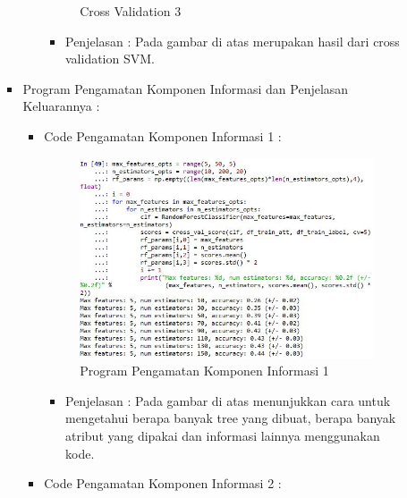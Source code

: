 \begin{enumerate}
\begin{itemize}
\begin{itemize}
\begin{itemize}
\begin{figure}[ht]
\caption{Cross Validation 3}
\label{contoh}
\end{figure}
\par
\begin{itemize}
\item Penjelasan : Pada gambar di atas merupakan hasil dari cross validation SVM.
\par
\par
\end{itemize}
\end{itemize}

\par
\par
\item Program Pengamatan Komponen Informasi dan Penjelasan Keluarannya :
\begin{itemize}
\item Code Pengamatan Komponen Informasi 1 :
\par
\begin{figure}[ht]
\centering
\includegraphics[scale=0.7]{figures/hmm/cod29.jpg}
\caption{Program Pengamatan Komponen Informasi 1}
\label{contoh}
\end{figure}
\par
\begin{itemize}
\item Penjelasan : Pada gambar di atas menunjukkan cara untuk mengetahui berapa banyak tree yang dibuat, berapa banyak atribut yang dipakai dan informasi lainnya menggunakan kode.
\par 
\par
\end{itemize}
\item Code Pengamatan Komponen Informasi 2 :
\par

\end{itemize}
\end{itemize}
\end{itemize}
\end{enumerate}
